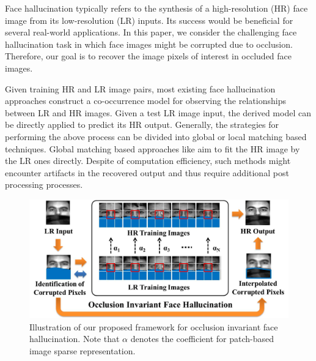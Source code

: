 
\label{sec:intro}
{
Face hallucination typically refers to the synthesis of a high-resolution (HR) face image from its low-resolution (LR) inputs. Its success would be beneficial for several real-world applications. In this paper, we consider the challenging face hallucination task in which face images might be corrupted due to occlusion. Therefore, our goal is to recover the image pixels of interest in occluded face images.

Given training HR and LR image pairs, most existing face hallucination approaches construct a co-occurrence model for observing the relationships between LR and HR images. Given a test LR image input, the derived model can be directly applied to predict its HR output. Generally, the strategies for performing the above process can be divided into global or local matching based techniques. Global matching based approaches like \cite{eigen, LR} aim to fit the HR image by the LR ones directly. Despite of computation efficiency, such methods might encounter artifacts in the recovered output and thus require additional post processing processes.

\begin{figure}
\graphicspath{{fig/}}
    \begin{center}
        \includegraphics[scale=0.34]{algFlow.jpg}
        \vspace{-0.5cm}
        \caption{\small{Illustration of our proposed framework for occlusion invariant face hallucination. Note that $\alpha$ denotes the coefficient for patch-based image sparse representation.}}
        \label{fig:algFlow}
    \end{center}\vspace{-.5cm}
\end{figure}

}
